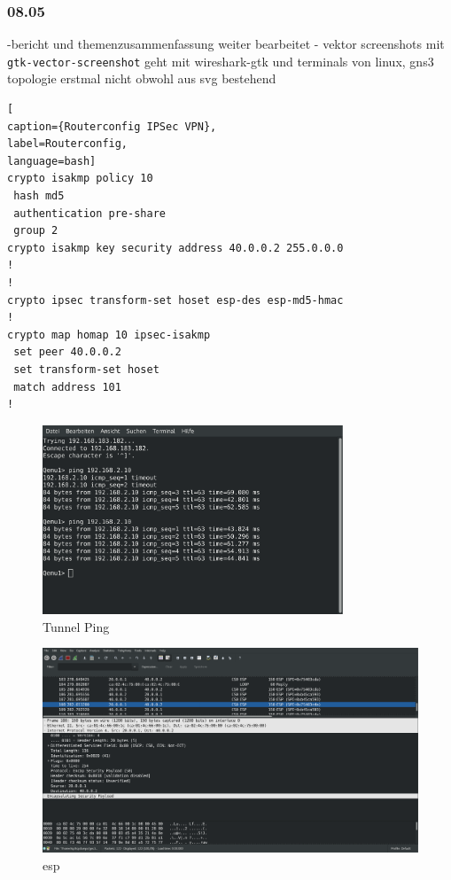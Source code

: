 \documentclass[english,runningheads,a4paper]{llncs}[2018/03/10]
\begin{document}
\subsubsection{08.05}
-bericht und themenzusammenfassung weiter bearbeitet
- vektor screenshots mit \texttt{gtk-vector-screenshot} geht mit wireshark-gtk und terminals von linux, gns3 topologie erstmal nicht obwohl aus svg bestehend
\begin{lstlisting}[
caption={Routerconfig IPSec VPN},
label=Routerconfig,
language=bash]
crypto isakmp policy 10
 hash md5
 authentication pre-share
 group 2
crypto isakmp key security address 40.0.0.2 255.0.0.0
!
!
crypto ipsec transform-set hoset esp-des esp-md5-hmac
!
crypto map homap 10 ipsec-isakmp
 set peer 40.0.0.2
 set transform-set hoset
 match address 101
!
\end{lstlisting}
\begin{figure}
	\centering
	\includegraphics[width=0.8\textwidth]{images/ping.pdf}
	\caption{Tunnel Ping}
	\label{fig:ping}
\end{figure}
\begin{figure}
	\centering
	\includegraphics[width=\textwidth]{images/esp.pdf}
	\caption{esp}
	\label{fig:esp}
\end{figure}
\end{document}

